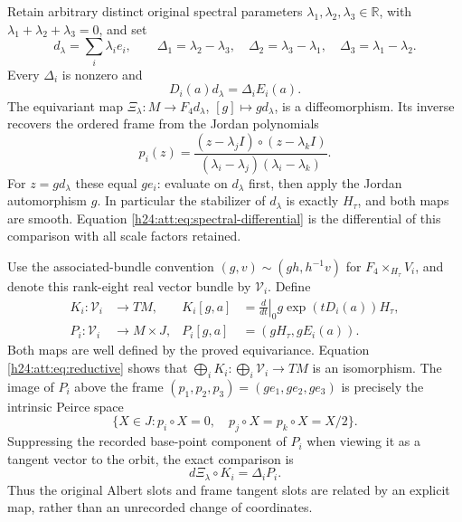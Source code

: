 Retain arbitrary distinct original spectral parameters
$\lambda_1,\lambda_2,\lambda_3\in\mathbb R$, with
$\lambda_1+\lambda_2+\lambda_3=0$, and set
\[
 d_\lambda=\sum_i\lambda_i e_i,\qquad
 \Delta_1=\lambda_2-\lambda_3,\quad
 \Delta_2=\lambda_3-\lambda_1,\quad
 \Delta_3=\lambda_1-\lambda_2.
\]
Every $\Delta_i$ is nonzero and
\begin{equation}
 D_i(a)d_\lambda=\Delta_i E_i(a).
 \label{h24:att:eq:spectral-differential}
\end{equation}
The equivariant map
$\Xi_\lambda:M\to F_4d_\lambda$, $[g]\mapsto gd_\lambda$,
is a diffeomorphism. Its inverse recovers the ordered frame from the
Jordan polynomials
\[
 p_i(z)=\frac{(z-\lambda_jI)\circ(z-\lambda_kI)}
              {(\lambda_i-\lambda_j)(\lambda_i-\lambda_k)}.
\]
For $z=gd_\lambda$ these equal $ge_i$: evaluate on $d_\lambda$ first,
then apply the Jordan automorphism $g$. In particular the stabilizer
of $d_\lambda$ is exactly $H_\tau$, and both maps are smooth.
Equation \eqref{h24:att:eq:spectral-differential} is the differential of
this comparison with all scale factors retained.

Use the associated-bundle convention
$(g,v)\sim(gh,h^{-1}v)$ for $F_4\times_{H_\tau}V_i$, and denote this
rank-eight real vector bundle by $\mathcal V_i$. Define
\begin{align}
 K_i:\mathcal V_i&\longrightarrow TM,&
 K_i[g,a]&=\left.\frac{d}{dt}\right|_0
                   g\exp(tD_i(a))H_\tau,\label{h24:att:eq:Kmap}\\
 P_i:\mathcal V_i&\longrightarrow M\times J,&
 P_i[g,a]&=(gH_\tau,gE_i(a)).\nonumber
\end{align}
Both maps are well defined by the proved equivariance.
Equation \eqref{h24:att:eq:reductive} shows that
$\bigoplus_iK_i:\bigoplus_i\mathcal V_i\to TM$ is an isomorphism.
The image of $P_i$ above the frame $(p_1,p_2,p_3)=(ge_1,ge_2,ge_3)$
is precisely the intrinsic Peirce space
\[
 \{X\in J:p_i\circ X=0,\quad p_j\circ X=p_k\circ X=X/2\}.
\]
Suppressing the recorded base-point component of $P_i$ when viewing
it as a tangent vector to the orbit, the exact comparison is
\begin{equation}
 d\Xi_\lambda\circ K_i=\Delta_iP_i.
 \label{h24:att:eq:bundle-comparison}
\end{equation}
Thus the original Albert slots and frame tangent slots are related
by an explicit map, rather than an unrecorded change of coordinates.

